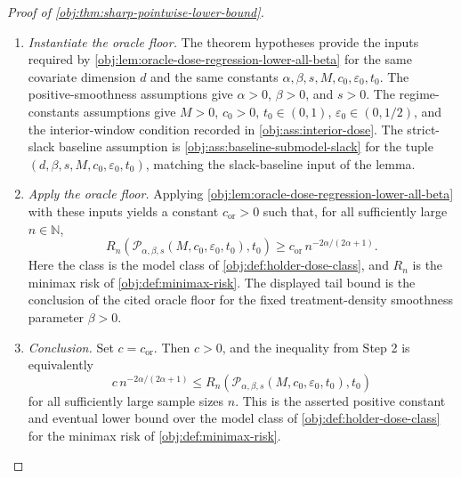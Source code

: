 \begin{proof}[Proof of \cref{obj:thm:sharp-pointwise-lower-bound}]
\begin{enumerate}
\item \emph{Instantiate the oracle floor.} The theorem hypotheses provide the inputs required by \cref{obj:lem:oracle-dose-regression-lower-all-beta} for the same covariate dimension \(d\) and the same constants \(\alpha,\beta,s,M,c_0,\varepsilon_0,t_0\). The positive-smoothness assumptions give \(\alpha>0\), \(\beta>0\), and \(s>0\). The regime-constants assumptions give \(M>0\), \(c_0>0\), \(t_0\in(0,1)\), \(\varepsilon_0\in(0,1/2)\), and the interior-window condition recorded in \cref{obj:ass:interior-dose}. The strict-slack baseline assumption is \cref{obj:ass:baseline-submodel-slack} for the tuple \((d,\beta,s,M,c_0,\varepsilon_0,t_0)\), matching the slack-baseline input of the lemma.

\item \emph{Apply the oracle floor.} Applying \cref{obj:lem:oracle-dose-regression-lower-all-beta} with these inputs yields a constant \(c_{\mathrm{or}}>0\) such that, for all sufficiently large \(n\in\mathbb N\),
\[
R_n\!\left(
    \mathcal P_{\alpha,\beta,s}(M,c_0,\varepsilon_0,t_0),
    t_0
  \right)
\ge
c_{\mathrm{or}}\,n^{-2\alpha/(2\alpha+1)} .
\]
Here the class is the model class of \cref{obj:def:holder-dose-class}, and \(R_n\) is the minimax risk of \cref{obj:def:minimax-risk}. The displayed tail bound is the conclusion of the cited oracle floor for the fixed treatment-density smoothness parameter \(\beta>0\).

\item \emph{Conclusion.} Set \(c=c_{\mathrm{or}}\). Then \(c>0\), and the inequality from Step 2 is equivalently
\[
  c\, n^{-2\alpha/(2\alpha+1)}
  \le
  R_n\!\left(
    \mathcal P_{\alpha,\beta,s}(M,c_0,\varepsilon_0,t_0),
    t_0
  \right)
\]
for all sufficiently large sample sizes \(n\). This is the asserted positive constant and eventual lower bound over the model class of \cref{obj:def:holder-dose-class} for the minimax risk of \cref{obj:def:minimax-risk}.
\end{enumerate}
\end{proof}

